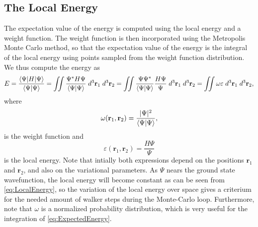 \documentclass[twoside]{article}
\newcommand{\bfr}{\ensuremath{\mathbf{r}}}
\begin{document}
\subsection{The Local Energy}\label{sec:localEnergy}
The expectation value of the energy is computed using the local energy and a weight function. The weight function is then incorporated using the Metropolis Monte Carlo method, so that the expectation value of the energy is the integral of the local energy using points sampled from the weight function distribution. We thus compute the energy as
\begin{equation}
E = \frac{\braket{\Psi|H|\Psi}}{\braket{\Psi|\Psi}} = 
\iint \frac{\Psi^* H \Psi}{\braket{\Psi|\Psi}}  \; d^3\bfr_1 \; d^3\bfr_2 = 
\iint \frac{\Psi\Psi^*}{\braket{\Psi|\Psi}} \frac{H \Psi}{\Psi} \; d^3\bfr_1 \; d^3\bfr_2 = \iint \omega \varepsilon \; d^3\bfr_1 \; d^3\bfr_2,
\label{eq:ExpectedEnergy}
\end{equation} 
where
\begin{equation}
\omega(\bfr_1,\bfr_2) = \frac{|\Psi|^2}{\braket{\Psi|\Psi}},
\end{equation}
is the weight function and
\begin{equation}
\varepsilon(\bfr_1,\bfr_2) = \frac{H \Psi}{\Psi}
\label{eq:LocalEnergy}
\end{equation}
is the local energy. Note that intially both expressions depend on the positions $\bfr_1$ and $\bfr_2$, and also on the variational parameters. As $\Psi$ nears the ground state wavefunction, the local energy will become constant as can be seen from \eqref{eq:LocalEnergy}, so the variation of the local energy  over space gives a criterium for the needed amount of walker steps during the Monte-Carlo loop. Furthermore, note that $\omega$ is a normalized probability distribution, which is very useful for the integration of \eqref{eq:ExpectedEnergy}.
\end{document}
